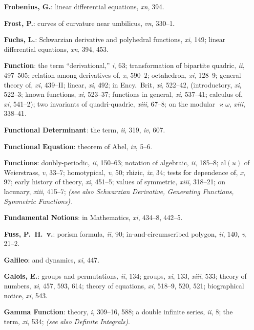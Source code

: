 \documentclass[11pt,a4paper]{article}
\newcommand{\IndexEntry}[1]{\textbf{#1}}
\newcommand{\SeeAlso}[1]{\textit{(see also #1)}}
\newcommand{\V}[1]{\textit{#1}} %
\begin{document}
\twocolumn
\small

\thispagestyle{fancy}
\setcounter{page}{99}

\IndexEntry{Frobenius, G.}: linear differential equations, \V{xn}, 394.

\IndexEntry{Frost, P.}: curves of curvature near umbilicus, \V{vn}, 330--1.

\IndexEntry{Fuchs, L.}: Schwarzian derivative and polyhedral functions, \V{xi}, 149; linear differential equations, \V{xn}, 394, 453.

\IndexEntry{Function}: the term ``derivational,'' \V{i}, 63; transformation of bipartite quadric, \V{ii}, 497--505; relation among derivatives of, \V{x}, 590--2; octahedron, \V{xi}, 128--9; general theory of, \V{xi}, 439--II; linear, \V{xi}, 492; in Ency.\ Brit, \V{xi}, 522--42, (introductory, \V{xi}, 522--3; known functions, \V{xi}, 523--37; functions in general, \V{xi}, 537--41; calculus of, \V{xi}, 541--2); two invariants of quadri-quadric, \V{xiii}, 67--8; on the modular $\varkappa\omega$, \V{xiii}, 338--41.

\IndexEntry{Functional Determinant}: the term, \V{ii}, 319, \V{iv}, 607.

\IndexEntry{Functional Equation}: theorem of Abel, \V{iv}, 5--6.

\IndexEntry{Functions}: doubly-periodic, \V{ii}, 150--63; notation of algebraic, \V{ii}, 185--8; al$(u)$ of Weierstrass, \V{v}, 33--7; homotypical, \V{v}, 50; rhizic, \V{ix}, 34; tests for dependence of, \V{x}, 97; early history of theory, \V{xi}, 451--5; values of symmetric, \V{xiii}, 318--21; on lacunary, \V{xiii}, 415--7; \SeeAlso{Schwarzian Derivative, Generating Functions, Symmetric Functions}.

\IndexEntry{Fundamental Notions}: in Mathematics, \V{xi}, 434--8, 442--5.

\IndexEntry{Fuss, P.\ H.\ v.}: porism formula, \V{ii}, 90; in-and-circumscribed polygon, \V{ii}, 140, \V{v}, 21--2.

\IndexEntry{Galileo}: and dynamics, \V{xi}, 447.

\IndexEntry{Galois, E.}: groups and permutations, \V{ii}, 134; groups, \V{xi}, 133, \V{xiii}, 533; theory of numbers, \V{xi}, 457, 593, 614; theory of equations, \V{xi}, 518--9, 520, 521; biographical notice, \V{xi}, 543.

\IndexEntry{Gamma Function}: theory, \V{i}, 309--16, 588; a double infinite series, \V{ii}, 8; the term, \V{xi}, 534; \SeeAlso{Definite Integrals}.
\end{document}
